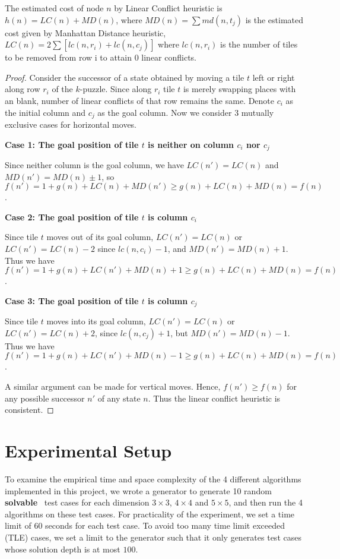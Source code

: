 \documentclass{llncs}
\begin{document}
The estimated cost of node $n$ by Linear Conflict heuristic is $h(n) = LC(n) + MD(n)$, where $MD(n)=\sum md(n,t_j)$ is the estimated cost given by Manhattan Distance heuristic, $LC(n) = 2\sum[lc(n,r_i) +lc(n,c_j)]$ where $lc(n,r_i)$ is the number of tiles to be removed from row i to attain 0 linear conflicts.
\begin{proof}
Consider the successor of a state obtained by moving a tile $t$ left or right along row $r_i$ of the $k$-puzzle. Since along $r_i$ tile $t$ is merely swapping places with an blank, number of linear conflicts of that row remains the same.
Denote $c_i$ as the initial column and $c_j$ as the goal column. Now we consider 3 mutually exclusive cases for horizontal moves.

\textbf{Case 1: The goal position of tile $t$ is neither on column $c_i$ nor $c_j$}

Since neither column is the goal column, we have $LC(n') = LC(n)$ and $MD(n') = MD(n) \pm 1$, so $f(n') = 1 + g(n) + LC(n) + MD(n') \geq g(n) + LC(n) + MD(n) = f(n)$.

\textbf{Case 2: The goal position of tile $t$ is column $c_i$}

Since tile $t$ moves out of its goal column, $LC(n') = LC(n)$ or $LC(n') = LC(n) - 2$ since $lc(n,c_i) - 1$, and $MD(n') = MD(n) + 1$. Thus we have $f(n') = 1 + g(n) + LC(n') + MD(n) + 1 \geq g(n) + LC(n) + MD(n) = f(n)$.

\textbf{Case 3: The goal position of tile $t$ is column $c_j$}

Since tile $t$ moves into its goal column, $LC(n') = LC(n)$ or $LC(n') = LC(n) + 2$, since $lc(n,c_j) + 1$, but $MD(n') = MD(n) - 1$. Thus we have $f(n') = 1 + g(n) + LC(n') + MD(n) - 1 \geq g(n) + LC(n) + MD(n) = f(n)$.

A similar argument can be made for vertical moves. Hence, $f(n') \geq f(n)$ for any possible successor $n'$ of any state $n$. Thus the linear conflict heuristic is consistent.
\end{proof}

\section{Experimental Setup}
To examine the empirical time and space complexity of the 4 different algorithms implemented in this project, we wrote a generator to generate 10 random \textbf{solvable}~\cite{solvable} test cases for each dimension $3 \times 3$, $4 \times 4$ and $5 \times 5$, and then run the 4 algorithms on these test cases. For practicality of the experiment, we set a time limit of $60$ seconds for each test case. To avoid too many time limit exceeded (TLE) cases, we set a limit to the generator such that it only generates test cases whose solution depth is at most $100$.
\end{document}
